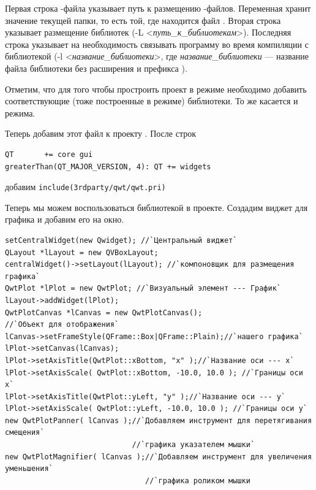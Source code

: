 Первая строка -файла указывает путь к размещению
-файлов. Переменная 
 хранит значение текущей папки, то есть той, где
находится файл . Вторая строка указывает размещение библиотек
(-L <\emph{путь\_к\_библиотекам}>). Последняя строка указывает на
необходимость связывать программу во время компиляции с библиотекой 
(-l <\emph{название\_библиотеки}>, где \emph{название\_библиотеки} ---
название файла библиотеки без расширения и префикса ).

Отметим, что для того чтобы простроить проект в  режиме необходимо добавить соответствующие (тоже построенные в
 режиме) библиотеки. То же касается и  режима. 

Теперь добавим этот файл к проекту . После строк
\begin{lstlisting}
QT       += core gui
greaterThan(QT_MAJOR_VERSION, 4): QT += widgets
\end{lstlisting}
добавим \lstinline!include(3rdparty/qwt/qwt.pri)!

Теперь мы можем воспользоваться библиотекой  в проекте. Создадим виджет для графика и добавим его на окно.
\begin{lstlisting}
setCentralWidget(new Qwidget); //`Центральный виджет`
QLayout *lLayout = new QVBoxLayout;
centralWidget()->setLayout(lLayout); //`компоновщик для размещения графика`
QwtPlot *lPlot = new QwtPlot; //`Визуальный элемент --- График`
lLayout->addWidget(lPlot);
QwtPlotCanvas *lCanvas = new QwtPlotCanvas();
//`Объект для отображения`
lCanvas->setFrameStyle(QFrame::Box|QFrame::Plain);//`нашего графика`
lPlot->setCanvas(lCanvas);
lPlot->setAxisTitle(QwtPlot::xBottom, "x" );//`Название оси --- x`
lPlot->setAxisScale( QwtPlot::xBottom, -10.0, 10.0 ); //`Границы оси x`
lPlot->setAxisTitle(QwtPlot::yLeft, "y" );//`Название оси --- y`
lPlot->setAxisScale( QwtPlot::yLeft, -10.0, 10.0 ); //`Границы оси у`
new QwtPlotPanner( lCanvas );//`Добавляем инструмент для перетягивания смещения` 
                             //`графика указателем мышки`
new QwtPlotMagnifier( lCanvas );//`Добавляем инструмент для увеличения уменьшения`
                                //`графика роликом мышки
\end{lstlisting}

